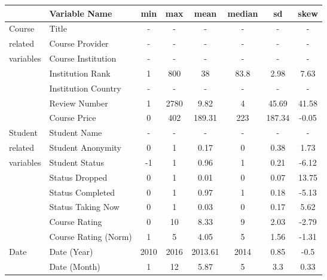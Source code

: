 \documentclass[
	a4paper,
	pdftex,
	12pt,	
	footinclude=true,
	fleqn,
	final,
	]{report}%
\begin{document}
\begin{table}[h]
\centering
\begin{tabular}{llcccccc}
\toprule
          & Variable Name              & min    & max  & mean & median  & sd   & skew	 \\ \toprule
Course    & Title                      & -    & -    & -       & -    & -        & -        \\
related   & Course Provider            & -    & -    & -       & -    & -        & -        \\
variables & Course Institution         & -    & -    & -       & -    & -        & -        \\
          & Institution Rank           & 1    & 800  & 38      & 83.8 & 2.98     & 7.63      \\
          & Institution Country        & -    & -    & -       & -    & -        & -         \\
          & Review Number	       & 1    & 2780 & 9.82	& 4   & 45.69    & 41.58    \\	
          & Course Price               & 0    & 402  & 189.31  & 223  & 187.34   & -0.05    \\ \midrule
Student   & Student Name               & -    & -    & -       & -    & -        & -        \\
related   & Student Anonymity          & 0    & 1    & 0.17    & 0    & 0.38     & 1.73     \\
variables & Student Status	       & -1   & 1    & 0.96    & 1    & 0.21     & -6.12    \\	
          & Status Dropped             & 0    & 1    & 0.01    & 0    & 0.07     & 13.75    \\
          & Status Completed           & 0    & 1    & 0.97    & 1    & 0.18     & -5.13    \\
          & Status Taking Now          & 0    & 1    & 0.03    & 0    & 0.17     & 5.62     \\
          & Course Rating              & 0    & 10   & 8.33    & 9    & 2.03     & -2.79    \\
          & Course Rating (Norm)       & 1    & 5    & 4.05    & 5    & 1.56     & -1.31    \\ \midrule
Date      & Date (Year)                & 2010 & 2016 & 2013.61 & 2014 & 0.85     & -0.5     \\
          & Date (Month)               & 1    & 12   & 5.87    & 5    & 3.3      & 0.33     \\ \midrule

\end{tabular}
\end{table}
\end{document}
